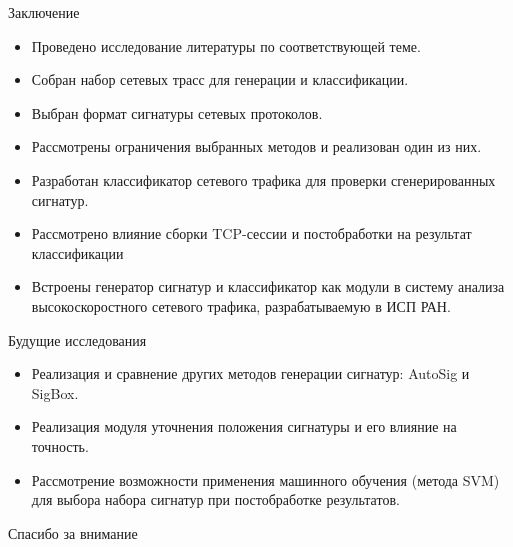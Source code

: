 \documentclass[10pt]{beamer}
\begin{document}
\begin{frame}{Заключение}
    \begin{itemize}
        \item Проведено исследование литературы по соответствующей теме.
        \item Собран набор сетевых трасс для генерации и классификации.
        \item Выбран формат сигнатуры сетевых протоколов.
        \item Рассмотрены ограничения выбранных методов и реализован один из них.
        \item Разработан классификатор сетевого трафика для проверки сгенерированных сигнатур.
        \item Рассмотрено влияние сборки TCP-сессии и постобработки на результат классификации
        \item Встроены генератор сигнатур и классификатор как модули в систему анализа высокоскоростного сетевого трафика, разрабатываемую в ИСП РАН.
    \end{itemize}
\end{frame}

\begin{frame}{Будущие исследования}

    \begin{itemize}
        \item Реализация и сравнение других методов генерации сигнатур: AutoSig и SigBox.
        \item Реализация модуля уточнения положения сигнатуры и его влияние на точность.
        \item Рассмотрение возможности применения машинного обучения (метода SVM) для выбора набора сигнатур при постобработке результатов.
    \end{itemize}
\end{frame}

\appendix

\begin{frame}[standout] \vfill Спасибо за внимание \vfill \end{frame}
\end{document}
